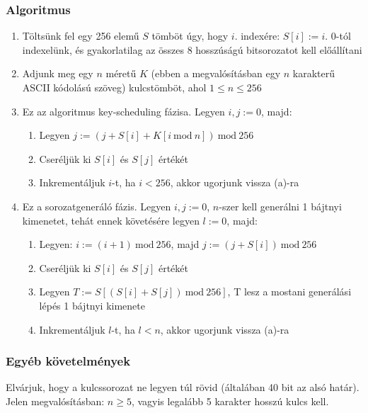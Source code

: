 \documentclass[12pt]{article}
\begin{document}
	\subsubsection*{Algoritmus}
	\begin{enumerate}
		\item Töltsünk fel egy 256 elemű $S$ tömböt úgy, hogy $i$. indexére: $S[i]:=i$. 0-tól indexelünk, és gyakorlatilag az összes 8 hosszúságú bitsorozatot kell előállítani
		\item Adjunk meg egy $n$ méretű $K$ (ebben a megvalósításban egy $n$ karakterű ASCII kódolású szöveg) kulcstömböt, ahol $1 \leq n \leq 256$
		\item Ez az algoritmus key-scheduling fázisa. Legyen $i, j:=0$, majd:
			\begin{enumerate}
				\item Legyen $j:=(j+S[i]+K[i \ \textrm{mod}\ n]) \ \textrm{mod} \ 256$
				\item Cseréljük ki $S[i]$ és $S[j]$ értékét
				\item Inkrementáljuk $i$-t, ha $i < 256$, akkor ugorjunk vissza (a)-ra
			\end{enumerate}
		\item Ez a sorozatgeneráló fázis. Legyen $i, j := 0$, $n$-szer kell generálni 1 bájtnyi kimenetet, tehát ennek követésére legyen $l:=0$, majd:
		\begin{enumerate}
			\item Legyen: $i := (i+1) \ \textrm{mod} \ 256$, majd $j := (j + S[i]) \ \textrm{mod} \ 256$
			\item Cseréljük ki $S[i]$ és $S[j]$ értékét
			\item Legyen $T := S[(S[i] + S[j]) \ \textrm{mod} \ 256]$, T lesz a mostani generálási lépés 1 bájtnyi kimenete
			\item Inkrementáljuk $l$-t, ha $l < n$, akkor ugorjunk vissza (a)-ra
		\end{enumerate}
	\end{enumerate}
	\subsubsection*{Egyéb követelmények}
	Elvárjuk, hogy a kulcssorozat ne legyen túl rövid (általában 40 bit az alsó határ). Jelen megvalósításban: $n \geq 5$, vagyis legalább 5 karakter hosszú kulcs kell.
\end{document}
